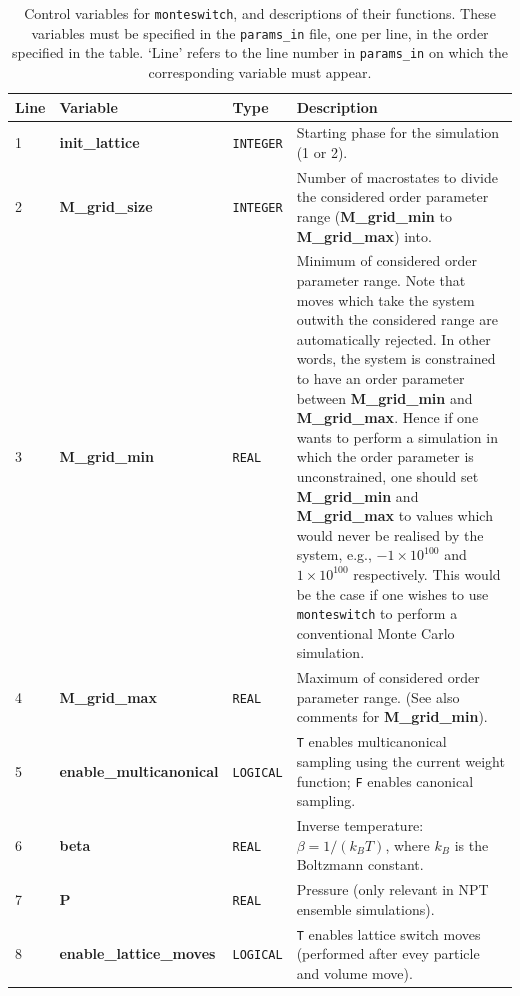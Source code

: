 \documentclass{report}
\begin{document}
\begin{landscape}
\begin{center}\label{table:params_in_variables}
\begin{longtable}{l l l p{8cm}}
\caption{Control variables for \texttt{monteswitch}, and descriptions of their functions. These variables must be specified in the \texttt{params\_in} file, 
one per line, in the order specified in the table. `Line' refers to the line number in \texttt{params\_in} on which the corresponding variable must appear.}
\\

Line & Variable & Type & Description \\
\hline
1 & \textbf{init\_lattice}  &  \texttt{INTEGER}  & Starting phase for the simulation (1 or 2). \\
2 & \textbf{M\_grid\_size}  &  \texttt{INTEGER}  & Number of macrostates to divide the considered order parameter range (\textbf{M\_grid\_min} to 
\textbf{M\_grid\_max}) into. \\
3 & \textbf{M\_grid\_min}  &  \texttt{REAL}  & Minimum of considered order parameter range. Note that moves which take the system outwith the considered 
range are automatically rejected. In other words, the system is constrained to have an order parameter between \textbf{M\_grid\_min} and 
\textbf{M\_grid\_max}. Hence
if one wants to perform a simulation in which the order parameter is unconstrained, one should set \textbf{M\_grid\_min} and \textbf{M\_grid\_max} to
values which would never be realised by the system, e.g., $-1\times 10^{100}$ and $1\times 10^{100}$ respectively. This would be the case if one wishes
to use \texttt{monteswitch} to perform a conventional Monte Carlo simulation. \\
4 & \textbf{M\_grid\_max}  &  \texttt{REAL}  & Maximum of considered order parameter range. (See also comments for \textbf{M\_grid\_min}).  \\
5 & \textbf{enable\_multicanonical}  &  \texttt{LOGICAL}  & \texttt{T} enables multicanonical sampling using the current weight function; \texttt{F} 
enables canonical sampling. \\
6 & \textbf{beta}  &  \texttt{REAL}  & Inverse temperature: $\beta=1/(k_BT)$, where $k_B$ is the Boltzmann constant.  \\
7 & \textbf{P}  &  \texttt{REAL}  & Pressure (only relevant in NPT ensemble simulations).  \\
8 & \textbf{enable\_lattice\_moves}  &  \texttt{LOGICAL}  & \texttt{T} enables lattice switch moves (performed after evey particle and volume move). \\

\end{longtable}
\end{center}
\end{landscape}
\end{document}
